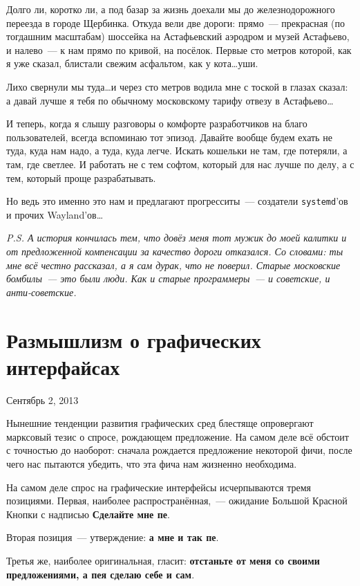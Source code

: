 Долго ли, коротко ли, а под базар за жизнь доехали мы до железнодорожного переезда в городе Щербинка. Откуда вели две дороги: прямо~--- прекрасная (по тогдашним масштабам) шоссейка на Астафьевский аэродром и музей Астафьево, и налево~--- к нам прямо по кривой, на посёлок. Первые сто метров которой, как я уже сказал, блистали свежим асфальтом, как у кота\dots уши.

Лихо свернули мы туда\dots и через сто метров водила мне с тоской в глазах сказал: а давай лучше я тебя по обычному московскому тарифу отвезу в Астафьево\dots

И теперь, когда я слышу разговоры о комфорте разработчиков на благо пользователей, всегда вспоминаю тот эпизод. Давайте вообще будем ехать не туда, куда нам надо, а туда, куда легче. Искать кошельки не там, где потеряли, а там, где светлее. И работать не с тем софтом, который для нас лучше по делу, а с тем, который проще разрабатывать.

Но ведь это именно это нам и предлагают прогресситы~--- создатели \texttt{systemd}'ов и прочих Wayland'ов\dots


\textit{P.S. А история кончилась тем, что довёз меня тот мужик до моей калитки и от предложенной компенсации за качество дороги отказался. Со словами: ты мне всё честно рассказал, а я сам дурак, что не поверил. Старые московские бомбилы~--- это были люди. Как и старые программеры~--- и советские, и анти-советские.}

\section{Размышлизм о графических интерфайсах} 
\begin{timeline}Сентябрь 2, 2013\end{timeline}

Нынешние тенденции развития графических сред блестяще опровергают марксовый тезис о спросе, рождающем предложение. На самом деле всё обстоит с точностью до наоборот: сначала рождается предложение некоторой фичи, после чего нас пытаются убедить, что эта фича нам жизненно необходима.

На самом деле спрос на графические интерфейсы исчерпываются тремя позициями. Первая, наиболее распространённая,~--- ожидание Большой Красной Кнопки с надписью 
\textbf{Сделайте мне пе}.

Вторая позиция~--- утверждение: 
\textbf{а мне и так пе}.

Третья же, наиболее оригинальная, гласит: 
\textbf{отстаньте от меня со своими предложениями, а пе я сделаю себе и сам}.

